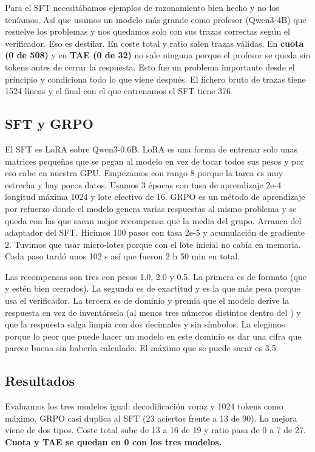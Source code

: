\documentclass[10pt,a4paper]{article}
\newcommand{\code}[1]{\texttt{\detokenize{#1}}}
\begin{document}
Para el SFT necesitábamos ejemplos de razonamiento bien hecho y no los teníamos. Así que usamos un modelo más grande como profesor (Qwen3-4B) que resuelve los problemas y nos quedamos solo con sus trazas correctas según el verificador. Eso es destilar.
En coste total y ratio salen trazas válidas.
En \textbf{cuota (0 de 508)} y en \textbf{TAE (0 de 32)} no sale ninguna porque el profesor se queda sin tokens antes de cerrar la respuesta.
Esto fue un problema importante desde el principio y condiciona todo lo que viene después. El fichero bruto de trazas tiene 1524 líneas y el final con el que entrenamos el SFT tiene 376.

\subsection*{SFT y GRPO}
El SFT es LoRA sobre Qwen3-0.6B. LoRA es una forma de entrenar solo unas matrices pequeñas que se pegan al modelo en vez de tocar todos sus pesos y por eso cabe en nuestra GPU.
Empezamos con rango 8 porque la tarea es muy estrecha y hay pocos datos. Usamos 3 épocas con tasa de aprendizaje 2e-4 longitud máxima 1024 y lote efectivo de 16.
GRPO es un método de aprendizaje por refuerzo donde el modelo genera varias respuestas al mismo problema y se queda con las que sacan mejor recompensa que la media del grupo.
Arranca del adaptador del SFT. Hicimos 100 pasos con tasa 2e-5 y acumulación de gradiente 2. Tuvimos que usar micro-lotes porque con el lote inicial no cabía en memoria.
Cada paso tardó unos 102 s así que fueron 2 h 50 min en total.

Las recompensas son tres con pesos 1.0, 2.0 y 0.5. La primera es de formato (que \code{<think>} y \code{<answer>} estén bien cerrados).
La segunda es de exactitud y es la que más pesa porque usa el verificador. La tercera es de dominio y premia que el modelo derive la respuesta en vez de inventársela (al menos tres números distintos dentro del \code{<think>}) y que la respuesta salga limpia con dos decimales y sin símbolos.
La elegimos porque lo peor que puede hacer un modelo en este dominio es dar una cifra que parece buena sin haberla calculado. El máximo que se puede sacar es 3.5.

\subsection*{Resultados}
Evaluamos los tres modelos igual: decodificación voraz y 1024 tokens como máximo. GRPO casi duplica al SFT (23 aciertos frente a 13 de 90).
La mejora viene de dos tipos. Coste total sube de 13 a 16 de 19 y ratio pasa de 0 a 7 de 27. \textbf{Cuota y TAE se quedan en 0 con los tres modelos.}
\end{document}
